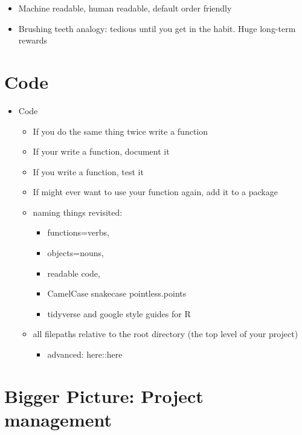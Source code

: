 \documentclass[
  12pt,
]{book}
\providecommand{\tightlist}{%
  \setlength{\itemsep}{0pt}\setlength{\parskip}{0pt}}
\theoremstyle{definition}
\theoremstyle{definition}
\theoremstyle{definition}
\theoremstyle{definition}
\theoremstyle{remark}
\begin{document}
\begin{itemize}
\begin{itemize}
    \begin{itemize}
    \tightlist
    \item
      Machine readable, human readable, default order friendly
    \item
      Brushing teeth analogy: tedious until you get in the habit. Huge long-term rewards
    \end{itemize}
  \end{itemize}
\end{itemize}

\hypertarget{code}{%
\section{Code}\label{code}}

\begin{itemize}
\tightlist
\item
  Code

  \begin{itemize}
  \tightlist
  \item
    If you do the same thing twice write a function
  \item
    If your write a function, document it
  \item
    If you write a function, test it
  \item
    If might ever want to use your function again, add it to a package
  \item
    naming things revisited:

    \begin{itemize}
    \tightlist
    \item
      functions=verbs,
    \item
      objects=nouns,
    \item
      readable code,
    \item
      CamelCase snakecase pointless.points
    \item
      tidyverse and google style guides for R
    \end{itemize}
  \item
    all filepaths relative to the root directory (the top level of your project)

    \begin{itemize}
    \tightlist
    \item
      advanced: here::here
    \end{itemize}
  \end{itemize}
\end{itemize}

\hypertarget{bigger-picture-project-management}{%
\section{Bigger Picture: Project management}\label{bigger-picture-project-management}}
\end{document}
